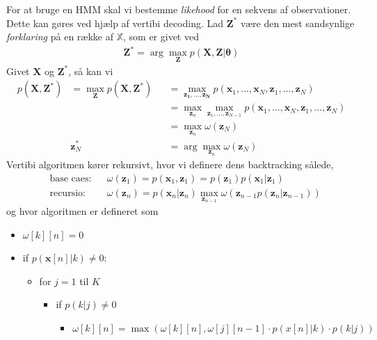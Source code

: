 \documentclass[paper=a4, fontsize=11pt]{scrartcl} %
\numberwithin{equation}{section} %
\numberwithin{figure}{section} %
\numberwithin{table}{section} %
\begin{document}
	For at bruge en HMM skal vi bestemme \textit{likehood} for en sekvens af observationer. Dette kan gøres ved hjælp af vertibi decoding. Lad $\mathbf{Z}^*$ være den mest sandsynlige \textit{forklaring} på en række af $\mathbb{X}$, som er givet ved 
	\begin{align*}
	\mathbf{Z}^*=\arg\underset{\mathbf{Z}}{\max}p(\mathbf{X},\mathbf{Z}|\mathbf{\theta})
	\end{align*}
	Givet $\mathbf{X}$ og $\mathbf{Z}^*$, så kan vi
	\begin{align*}
	p(\mathbf{X},\mathbf{Z}^*)&= \underset{\mathbf{Z}}{\max}p(\mathbf{X},\mathbf{Z}^*)&&=\underset{\mathbf{\mathbf{z}_1,...,\mathbf{z}_N}}{\max}p(\mathbf{x}_1,...,\mathbf{x}_N,\mathbf{z}_1,...,\mathbf{z}_N) \\
	& &&=\underset{\mathbf{z}_n}{\max}\underset{\mathbf{z}_1,...,\mathbf{z}_{N-1}}{\max}p(\mathbf{x}_1,...,\mathbf{x}_N,\mathbf{z}_1,...,\mathbf{z}_N) \\
	& &&=\underset{\mathbf{z}_n}{\max}\omega(\mathbf{z}_N) \\
	& \mathbf{z}^*_N&&=\arg\underset{\mathbf{z}_n}{\max}\omega(\mathbf{z}_N) 
	\end{align*}
	Vertibi algoritmen kører rekursivt, hvor vi definere dens backtracking sålede,
	\begin{align*}
	&\text{base caes:} && \omega(\mathbf{z}_1)=p(\mathbf{x}_1,\mathbf{z}_1) = p(\mathbf{z}_1)p(\mathbf{x}_1|\mathbf{z}_1) \\
	& \text{recursio:} &&\omega(\mathbf{z}_n)=p(\mathbf{x}_n|\mathbf{z}_n)\underset{\mathbf{z}_{n-1}}{\max}\omega(\mathbf{z}_{n-1}p(\mathbf{z}_n|\mathbf{z}_{n-1}))
	\end{align*}
	og hvor algoritmen er defineret som
	\begin{itemize}
		\item $\omega[k][n]=0$
		\item if $p(\mathbf{x}[n] |k) \not= 0$:
		\begin{itemize}
			\item for $j=1$ til $K$
			\begin{itemize}
				\item if $p(k|j) \not= 0$
				\begin{itemize}
					\item $\omega[k][n] =\max( \omega[k][n], \omega[j][n-1]\cdot p(x[n] | k) \cdot p(k | j))$
				\end{itemize}
			\end{itemize}
		\end{itemize}
	\end{itemize}
	
\end{document}
